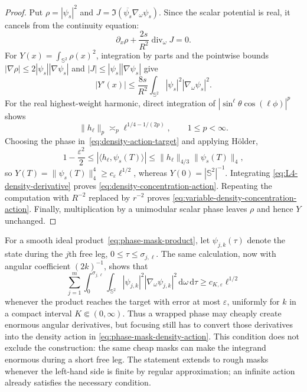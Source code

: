 \documentclass[11pt]{article}
\newcommand{\dd}{\,\mathrm d}
\theoremstyle{definition}
\theoremstyle{remark}
\begin{document}
\begin{proof}
Put $\rho=|\psi_s|^2$ and
$J=\Im(\overline{\psi_s}\nabla_\omega\psi_s)$.  Since the scalar potential is
real, it cancels from the continuity equation:
\begin{equation}
 \partial_x\rho+\frac{2s}{R^2}\operatorname{div}_\omega J=0.
\end{equation}
For $Y(x)=\int_{\mathbb S^2}\rho(x)^2$, integration by parts and the pointwise
bounds $|\nabla\rho|\leq2|\psi_s||\nabla\psi_s|$ and
$|J|\leq|\psi_s||\nabla\psi_s|$ give
\begin{equation}
 |Y'(x)|\leq\frac{8s}{R^2}
 \int_{\mathbb S^2}|\psi_s|^2|\nabla_\omega\psi_s|^2.
 \label{eq:L4-density-derivative}
\end{equation}
For the real highest-weight harmonic, direct integration of
$|\sin^\ell\theta\cos(\ell\phi)|^p$ shows
\begin{equation}
 \|h_\ell\|_p\asymp_p
 \ell^{1/4-1/(2p)},
 \qquad 1\leq p<\infty.
 \label{eq:highest-weight-Lp}
\end{equation}
Choosing the phase in~\eqref{eq:density-action-target} and applying Hölder,
\begin{equation}
 1-\frac{\varepsilon^2}{2}
 \leq|\langle h_\ell,\psi_s(T)\rangle|
 \leq\|h_\ell\|_{4/3}\|\psi_s(T)\|_4,
\end{equation}
so $Y(T)=\|\psi_s(T)\|_4^4\geq c_\varepsilon\ell^{1/2}$, whereas
$Y(0)=|\mathbb S^2|^{-1}$.  Integrating
\eqref{eq:L4-density-derivative} proves
\eqref{eq:density-concentration-action}.  Repeating the computation with
$R^{-2}$ replaced by $r^{-2}$ proves
\eqref{eq:variable-density-concentration-action}.  Finally, multiplication by
a unimodular scalar phase leaves $\rho$ and hence $Y$ unchanged.
\end{proof}

For a smooth ideal product~\eqref{eq:phase-mask-product}, let
$\psi_{j,k}(\tau)$ denote the state during the $j$th free leg,
$0\leq\tau\leq\sigma_{j,\ell}$.  The same calculation, now with angular
coefficient $(2k)^{-1}$, shows that
\begin{equation}
 \sum_{j=1}^{m}\int_0^{\sigma_{j,\ell}}
 \int_{\mathbb S^2}|\psi_{j,k}|^2|\nabla_\omega\psi_{j,k}|^2
 \dd\omega\dd\tau
 \geq c_{K,\varepsilon}\ell^{1/2}
 \label{eq:phase-mask-density-action}
\end{equation}
whenever the product reaches the target with error at most $\varepsilon$,
uniformly for $k$ in a compact interval $K\Subset(0,\infty)$.  Thus a wrapped
phase may cheaply create enormous angular derivatives, but focusing still has
to convert those derivatives into the density action in
\eqref{eq:phase-mask-density-action}.  This condition does not exclude the
construction: the same cheap masks can make the integrand enormous during a
short free leg.  The statement extends to rough masks whenever the left-hand
side is finite by regular approximation; an infinite action already satisfies
the necessary condition.
\end{document}

